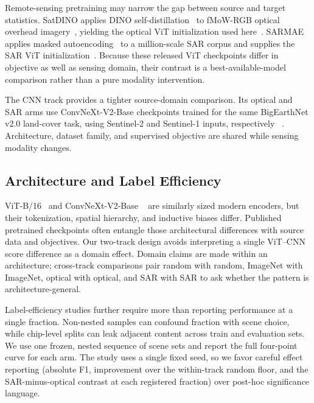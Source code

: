 Remote-sensing pretraining may narrow the gap between source and target
statistics. SatDINO applies DINO self-distillation~\cite{caron2021emerging} to
fMoW-RGB optical overhead imagery~\cite{christie2018fmow}, yielding the optical
ViT initialization used here~\cite{straka2025satdino}. SARMAE applies masked
autoencoding~\cite{he2022masked} to a million-scale SAR corpus and supplies the
SAR ViT initialization~\cite{liu2026sarmae}. Because these released ViT
checkpoints differ in objective as well as sensing domain, their contrast is a
best-available-model comparison rather than a pure modality intervention.

The CNN track provides a tighter source-domain comparison. Its optical and SAR
arms use ConvNeXt-V2-Base checkpoints trained for the same BigEarthNet v2.0
land-cover task, using Sentinel-2 and Sentinel-1 inputs, respectively
~\cite{sumbul2019bigearthnet,clasen2025reben}. Architecture, dataset family,
and supervised objective are shared while sensing modality changes.

\subsection{Architecture and Label Efficiency}

ViT-B/16~\cite{dosovitskiy2021image} and ConvNeXt-V2-Base
~\cite{woo2023convnextv2} are similarly sized modern encoders, but their
tokenization, spatial hierarchy, and inductive biases differ. Published
pretrained checkpoints often entangle those architectural differences with
source data and objectives. Our two-track design avoids interpreting a single
ViT--CNN score difference as a domain effect. Domain claims are made within an
architecture; cross-track comparisons pair random with random, ImageNet with
ImageNet, optical with optical, and SAR with SAR to ask whether the pattern is
architecture-general.

Label-efficiency studies further require more than reporting performance at a
single fraction. Non-nested samples can confound fraction with scene choice,
while chip-level splits can leak adjacent content across train and evaluation
sets. We use one frozen, nested sequence of scene sets and report the full
four-point curve for each arm. The study uses a single fixed seed, so we
favor careful effect reporting (absolute F1, improvement over the
within-track random floor, and the SAR-minus-optical contrast at each
registered fraction) over post-hoc significance language.
